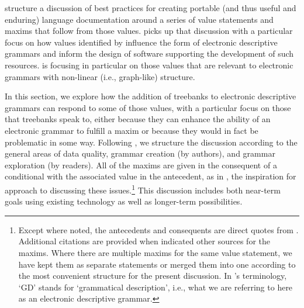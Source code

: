  structure a discussion of best practices
for creating portable (and thus useful and enduring) language
documentation around a series of value statements and maxims
that follow from those values.   picks
up that discussion with a particular focus on how values
identified by \citeauthor{Bir:Sim:03}
influence the form of electronic descriptive grammars and inform the
design of software supporting the development of such resources.
\citeauthor{Nordhoff:08} is focusing in particular on those values
that are relevant to electronic grammars with non-linear
(i.e., graph-like) structure. 

In this section, we explore how the addition of treebanks to
electronic descriptive grammars can respond to some of those values,
with a particular focus on those that treebanks speak to, either
because they can enhance the ability of an electronic grammar to
fulfill a maxim or because they would in fact be problematic in some
way.  Following \citeauthor{Nordhoff:08}, we structure the discussion
according to the general areas of data quality, grammar creation (by
authors), and grammar exploration (by readers).  All of the maxims are
given in the consequent of a conditional with the associated value in
the antecedent, as in , the inspiration for
 approach to discussing these
issues.\footnote{Except where noted, the antecedents and consequents
  are direct quotes from .  Additional
  citations are provided when \citeauthor{Nordhoff:08} indicated other
  sources for the maxims.  Where there are multiple maxims for the
  same value statement, we have kept them as separate statements or
  merged them into one according to the most convenient structure for
  the present discussion. In \citeauthor{Nordhoff:08}'s terminology,
  `GD' stands for `grammatical description', i.e., what we are
  referring to here as an electronic descriptive grammar.}  This
discussion includes both near-term goals using existing technology as
well as longer-term possibilities.

